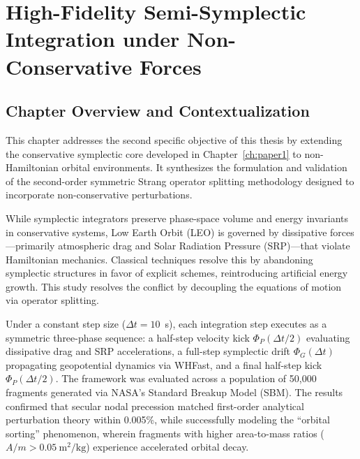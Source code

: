 \documentclass[12pt,letterpaper,twoside]{book}
\begin{document}
\cleardoublepage

\chapter{High-Fidelity Semi-Symplectic Integration under Non-Conservative Forces}
\label{ch:paper2}

\section*{Chapter Overview and Contextualization}
This chapter addresses the second specific objective of this thesis by extending the conservative symplectic core developed in Chapter~\ref{ch:paper1} to non-Hamiltonian orbital environments. It synthesizes the formulation and validation of the second-order symmetric Strang operator splitting methodology designed to incorporate non-conservative perturbations.

While symplectic integrators preserve phase-space volume and energy invariants in conservative systems, Low Earth Orbit (LEO) is governed by dissipative forces---primarily atmospheric drag and Solar Radiation Pressure (SRP)---that violate Hamiltonian mechanics. Classical techniques resolve this by abandoning symplectic structures in favor of explicit schemes, reintroducing artificial energy growth. This study resolves the conflict by decoupling the equations of motion via operator splitting.

Under a constant step size ($\Delta t = 10$~s), each integration step executes as a symmetric three-phase sequence: a half-step velocity kick $\Phi_P(\Delta t/2)$ evaluating dissipative drag and SRP accelerations, a full-step symplectic drift $\Phi_G(\Delta t)$ propagating geopotential dynamics via WHFast, and a final half-step kick $\Phi_P(\Delta t/2)$. The framework was evaluated across a population of 50,000 fragments generated via NASA's Standard Breakup Model (SBM). The results confirmed that secular nodal precession matched first-order analytical perturbation theory within 0.005\%, while successfully modeling the ``orbital sorting'' phenomenon, wherein fragments with higher area-to-mass ratios ($A/m > 0.05~\text{m}^2/\text{kg}$) experience accelerated orbital decay.

\newpage
% 
\end{document}
